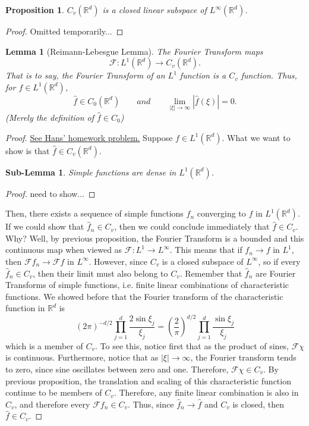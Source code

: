 \documentclass[letterpaper,twoside,12pt]{article}
\theoremstyle{mystyle}
\newtheorem{lemma}[theorem]{Lemma}
\newtheorem{slem}{Sub-Lemma}
\newtheorem{prop}{Proposition}[section]
\newcommand{\R}{{\mathbb R}}
\newcommand{\cg}{\color{gray}}
\newcommand{\cbk}{\color{black}}
\newcommand{\cred}{\color{red}}
\newcommand{\cblu}{\color{blue}}
\begin{document}
\begin{prop}
  $C_v\left( \R^d \right)$ is a closed linear subspace of $L^\infty\left( \R^d \right)$. 
\end{prop}
\begin{proof}
  \cred Omitted temporarily...\cbk 
\end{proof}

\begin{lemma}[Reimann-Lebesgue Lemma]
  The Fourier Transform maps 
  \[\mathcal{F}:{L^1}\left( {{\mathbb{R}^d}} \right) \to {C_v}\left( {{\mathbb{R}^d}} \right).\]
  \cg That is to say, the Fourier Transform of an $L^1$ function is a $C_v$ function. \cbk Thus, for $f\in L^1\left( \R^d \right)$, 
  \[\hat f \in {C_0}\left( {{\mathbb{R}^d}} \right)\qquad and\qquad \mathop {\lim }\limits_{\left| \xi  \right| \to \infty } \left| {\hat f\left( \xi  \right)} \right| = 0.\] (Merely the definition of $\hat f \in C_0$)
\end{lemma}
\begin{proof}
  \href{https://web.ma.utexas.edu/users/koch/teaching/M383C-F22/access/M383C-F22-HW2-Solutions.pdf}{See Hans' homework problem.} 
  Suppose $f \in L^1\left( \R^d \right)$. What we want to show is that $\hat f \in C_v\left( \R^d \right)$. 

  \cblu
  \begin{slem} 
    Simple functions are dense in $L^1\left( \R^d \right)$. 
  \end{slem}
  \begin{proof}
    need to show...
  \end{proof}
  \cbk 
  Then, there exists a sequence of simple functions $f_n$ converging to $f$ in $L^1\left( \R^d \right)$.  If we could show that $\hat f_n \in C_v$, then we could conclude immediately that $\hat f \in C_v$. \cg Why? Well, by previous proposition, the Fourier Transform is a bounded and this continuous map when viewed as $\mathcal F : L^1 \to L^\infty$. This means that if $f_n \to f$ in $L^1$, then $\mathcal F f_n \to \mathcal F f$ in $L^\infty$. However, since $C_v$ is a closed subspace of $L^\infty$, so if every $\hat f_n \in C_v$, then their limit must also belong to $C_v$. \cbk
  Remember that $\hat f_n$ are Fourier Transforms of simple functions, i.e. finite linear combinations of characteristic functions. We showed before that the Fourier transform of the characteristic function in $\R^d$ is 
  \[{\left( {2\pi } \right)^{ - d/2}}\prod\limits_{j = 1}^d {\frac{{2\sin {\xi _j}}}{{{\xi _j}}}}  = {\left( {\frac{2}{\pi }} \right)^{d/2}}\prod\limits_{j = 1}^d {\frac{{\sin {\xi _j}}}{{{\xi _j}}}} \]
  which is a member of $C_v$. To see this, notice first that as the product of sines, $\mathcal F \chi$ is continuous. Furthermore, notice that as $|\xi|\to\infty$, the Fourier transform tends to zero, since sine oscillates between zero and one. Therefore, $\mathcal F \chi \in C_v$. By previous proposition, the translation and scaling of this characteristic function continue to be members of $C_v$. Therefore, any finite linear combination is also in $C_v$, and therefore every $\mathcal F f_n \in C_v$. Thus, since $\hat f_n \to \hat f$ and $C_v$ is closed, then $\hat f \in C_v$. 
  
\end{proof}
\end{document}
